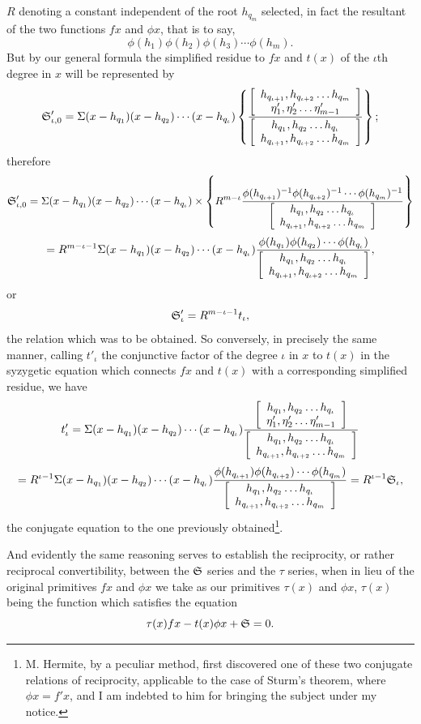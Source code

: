 \documentclass[11pt]{article}
\newcommand{\sourcepage}[1]{\marginpar{\scriptsize p.~#1}}
\begin{document}
\sourcepage{482}
$R$ denoting a constant independent of the root $h_{q_m}$ selected, in fact the resultant of the two functions $fx$ and $\phi x$, that is to say,
\[
\phi(h_1)\phi(h_2)\phi(h_3)\cdots\phi(h_m).
\]
But by our general formula the simplified residue to $fx$ and $t(x)$ of the $\iota$th degree in $x$ will be represented by
\[
\mathfrak{S}'_{\iota,0}=\Sigma(x-h_{q_1})(x-h_{q_2})\cdots(x-h_{q_\iota})
\left\{\frac{\left[\begin{array}{c}h_{q_{\iota+1}},h_{q_{\iota+2}}\ldots h_{q_m}\\\eta'_1,\eta'_2\ldots\eta'_{m-1}\end{array}\right]}
{\left[\begin{array}{c}h_{q_1},h_{q_2}\ldots h_{q_\iota}\\h_{q_{\iota+1}},h_{q_{\iota+2}}\ldots h_{q_m}\end{array}\right]}\right\};
\]
therefore
\[
\mathfrak{S}'_{\iota,0}=\Sigma(x-h_{q_1})(x-h_{q_2})\cdots(x-h_{q_\iota})\times
\left\{R^{m-\iota}\frac{\phi(h_{q_{\iota+1}})^{-1}\phi(h_{q_{\iota+2}})^{-1}\cdots\phi(h_{q_m})^{-1}}
{\left[\begin{array}{c}h_{q_1},h_{q_2}\ldots h_{q_\iota}\\h_{q_{\iota+1}},h_{q_{\iota+2}}\ldots h_{q_m}\end{array}\right]}\right\}
\]
\[
=R^{m-\iota-1}\Sigma(x-h_{q_1})(x-h_{q_2})\cdots(x-h_{q_\iota})
\frac{\phi(h_{q_1})\phi(h_{q_2})\cdots\phi(h_{q_\iota})}
{\left[\begin{array}{c}h_{q_1},h_{q_2}\ldots h_{q_\iota}\\h_{q_{\iota+1}},h_{q_{\iota+2}}\ldots h_{q_m}\end{array}\right]},
\]
or
\[
\mathfrak{S}'_\iota=R^{m-\iota-1}t_\iota,
\]
the relation which was to be obtained. So conversely, in precisely the same manner, calling $t'_\iota$ the conjunctive factor of the degree $\iota$ in $x$ to $t(x)$ in the syzygetic equation which connects $fx$ and $t(x)$ with a corresponding simplified residue, we have
\[
t'_\iota=\Sigma(x-h_{q_1})(x-h_{q_2})\cdots(x-h_{q_\iota})
\frac{\left[\begin{array}{c}h_{q_1},h_{q_2}\ldots h_{q_\iota}\\\eta'_1,\eta'_2\ldots\eta'_{m-1}\end{array}\right]}
{\left[\begin{array}{c}h_{q_1},h_{q_2}\ldots h_{q_\iota}\\h_{q_{\iota+1}},h_{q_{\iota+2}}\ldots h_{q_m}\end{array}\right]}
\]
\[
=R^{\iota-1}\Sigma(x-h_{q_1})(x-h_{q_2})\cdots(x-h_{q_\iota})
\frac{\phi(h_{q_{\iota+1}})\phi(h_{q_{\iota+2}})\cdots\phi(h_{q_m})}
{\left[\begin{array}{c}h_{q_1},h_{q_2}\ldots h_{q_\iota}\\h_{q_{\iota+1}},h_{q_{\iota+2}}\ldots h_{q_m}\end{array}\right]}
=R^{\iota-1}\mathfrak{S}_\iota,
\]
the conjugate equation to the one previously obtained\footnote{M. Hermite, by a peculiar method, first discovered one of these two conjugate relations of reciprocity, applicable to the case of Sturm's theorem, where $\phi x=f'x$, and I am indebted to him for bringing the subject under my notice.}.

And evidently the same reasoning serves to establish the reciprocity, or rather reciprocal convertibility, between the $\mathfrak{S}$ series and the $\tau$ series, when in lieu of the original primitives $fx$ and $\phi x$ we take as our primitives $\tau(x)$ and $\phi x$, $\tau(x)$ being the function which satisfies the equation
\[
\tau(x)fx-t(x)\phi x+\mathfrak{S}=0.
\]
\end{document}

